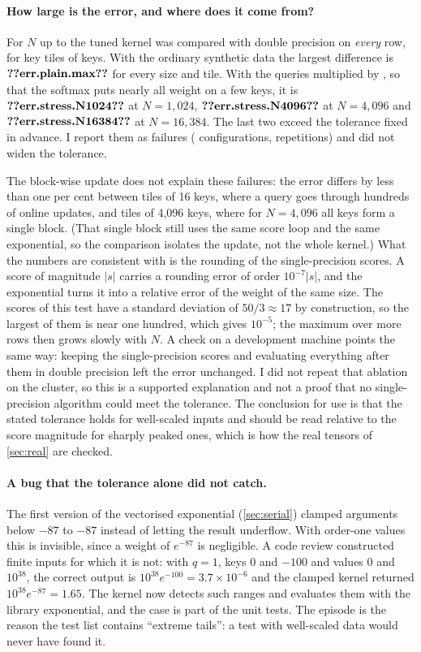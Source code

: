 \paragraph{How large is the error, and where does it come from?} For $N$ up to
 the tuned kernel was compared with double precision on
\emph{every} row, for key tiles of  keys. With the ordinary synthetic
data the largest difference is $\n{err.plain.max}$ for every size and tile. With
the queries multiplied by , so that the softmax puts nearly all weight
on a few keys, it is $\n{err.stress.N1024}$ at $N=1{,}024$, $\n{err.stress.N4096}$ at
$N=4{,}096$ and $\n{err.stress.N16384}$ at $N=16{,}384$. The last two exceed the
tolerance fixed in advance. I report them as failures (
configurations,  repetitions) and did not widen the tolerance.

The block-wise update does not explain these failures: the error differs by less
than one per cent between tiles of 16 keys, where a query goes through hundreds of
online updates, and tiles of 4{,}096 keys, where for $N=4{,}096$ all keys form a
single block. (That single block still uses the same score loop and the same
exponential, so the comparison isolates the update, not the whole kernel.) What
the numbers are consistent with is the rounding of the single-precision scores. A
score of magnitude $|s|$ carries a rounding error of order $10^{-7}|s|$, and the
exponential turns it into a relative error of the weight of the same size. The
scores of this test have a standard deviation of $50/3\approx17$ by construction,
so the largest of them is near one hundred, which gives $10^{-5}$; the maximum over
more rows then grows slowly with $N$. A check on a development machine points the
same way: keeping the single-precision scores and evaluating everything after them
in double precision left the error unchanged. I did not repeat that ablation on the
cluster, so this is a supported explanation and not a proof that no
single-precision algorithm could meet the tolerance. The conclusion for use is that
the stated tolerance holds for well-scaled inputs and should be read relative to
the score magnitude for sharply peaked ones, which is how the real tensors of
\cref{sec:real} are checked.

\paragraph{A bug that the tolerance alone did not catch.} The first version of the
vectorised exponential (\cref{sec:serial}) clamped arguments below $-87$ to $-87$
instead of letting the result underflow. With order-one values this is invisible,
since a weight of $e^{-87}$ is negligible. A code review constructed finite inputs
for which it is not: with $q=1$, keys $0$ and $-100$ and values $0$ and $10^{38}$,
the correct output is $10^{38}e^{-100}=3.7\times10^{-6}$ and the clamped kernel returned
$10^{38}e^{-87}=1.65$. The
kernel now detects such ranges and evaluates them with the library exponential, and
the case is part of the unit tests. The episode is the reason the test list
contains ``extreme tails'': a test with well-scaled data would never have found it.
